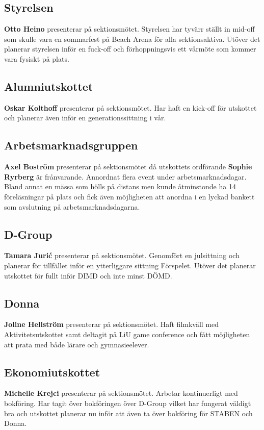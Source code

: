 \documentclass[../protokoll_vintermote_2022.tex]{subfiles}
\begin{document}
\subsection{Styrelsen}
\textbf{Otto Heino} presenterar på sektionsmötet.
Styrelsen har tyvärr ställt in mid-off som skulle vara en sommarfest på Beach Arena för alla sektionsaktiva. Utöver det planerar styrelsen inför en fuck-off och förhoppningsvis ett vårmöte som kommer vara fysiskt på plats.

\subsection{Alumniutskottet}
\textbf{Oskar Kolthoff} presenterar på sektionsmötet.
Har haft en kick-off för utskottet och planerar även inför en generationssittning i vår.

\subsection{Arbetsmarknadsgruppen}
\textbf{Axel Boström} presenterar på sektionsmötet då utskottets ordförande \textbf{Sophie Ryrberg} är frånvarande.
Annordnat flera event under arbetsmarknadsdagar. Bland annat en mässa som hölls på distans men kunde åtminstonde ha 14 föreläsningar på plats och fick även möjligheten att anordna i en lyckad bankett som avslutning på arbetsmarknadsdagarna.

\subsection{D-Group}
\textbf{Tamara Jurić} presenterar på sektionsmötet.
Genomfört en julsittning och planerar för tillfället inför en ytterliggare sittning Förspelet. Utöver det planerar utskottet för fullt inför DIMD och inte minst DÖMD.

\subsection{Donna}
\textbf{Joline Hellström} presenterar på sektionsmötet.
Haft filmkväll med Aktivitetsutskottet samt deltagit på LiU game conference och fått möjligheten att prata med både lärare och gymnasieelever.

\subsection{Ekonomiutskottet}
\textbf{Michelle Krejci} presenterar på sektionsmötet.
Arbetar kontinuerligt med bokföring. Har tagit över bokföringen över D-Group vilket har fungerat väldigt bra och utskottet planerar nu inför att även ta över bokföring för STABEN och Donna.
\end{document}
